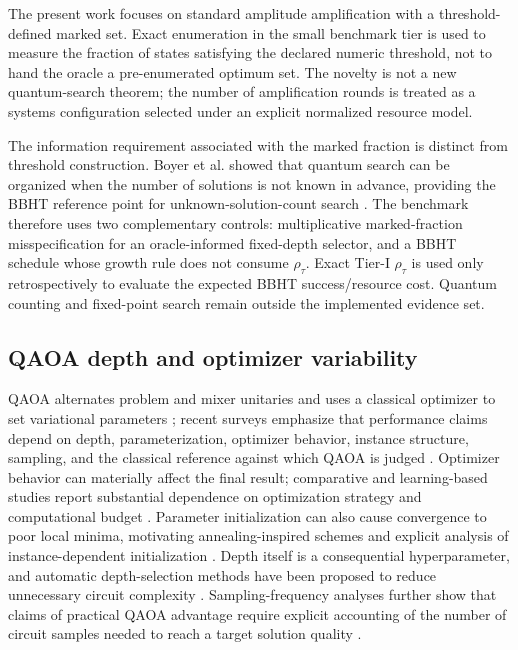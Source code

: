 \documentclass[5p,times]{elsarticle}
\begin{document}
The present work focuses on standard amplitude amplification with a threshold-defined marked set. Exact enumeration in the small benchmark tier is used to measure the fraction of states satisfying the declared numeric threshold, not to hand the oracle a pre-enumerated optimum set. The novelty is not a new quantum-search theorem; the number of amplification rounds is treated as a systems configuration selected under an explicit normalized resource model.

The information requirement associated with the marked fraction is distinct from threshold construction. Boyer et al. showed that quantum search can be organized when the number of solutions is not known in advance, providing the BBHT reference point for unknown-solution-count search \cite{boyer1998}. The benchmark therefore uses two complementary controls: multiplicative marked-fraction misspecification for an oracle-informed fixed-depth selector, and a BBHT schedule whose growth rule does not consume $\rho_\tau$. Exact Tier-I $\rho_\tau$ is used only retrospectively to evaluate the expected BBHT success/resource cost. Quantum counting and fixed-point search remain outside the implemented evidence set.

\subsection{QAOA depth and optimizer variability}
QAOA alternates problem and mixer unitaries and uses a classical optimizer to set variational parameters \cite{farhi2014}; recent surveys emphasize that performance claims depend on depth, parameterization, optimizer behavior, instance structure, sampling, and the classical reference against which QAOA is judged \cite{blekos2024review}. Optimizer behavior can materially affect the final result; comparative and learning-based studies report substantial dependence on optimization strategy and computational budget \cite{fernandez2022,cheng2024darbo}. Parameter initialization can also cause convergence to poor local minima, motivating annealing-inspired schemes and explicit analysis of instance-dependent initialization \cite{sack2021,katial2024instance}. Depth itself is a consequential hyperparameter, and automatic depth-selection methods have been proposed to reduce unnecessary circuit complexity \cite{pan2022}. Sampling-frequency analyses further show that claims of practical QAOA advantage require explicit accounting of the number of circuit samples needed to reach a target solution quality \cite{lykov2023}.
\end{document}

